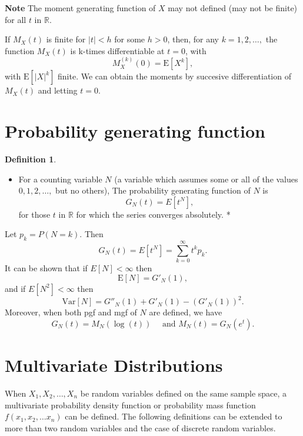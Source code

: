 \documentclass[
]{book}
\providecommand{\tightlist}{%
  \setlength{\itemsep}{0pt}\setlength{\parskip}{0pt}}
\theoremstyle{definition}
\newtheorem{definition}{Definition}[chapter]
\theoremstyle{definition}
\theoremstyle{definition}
\theoremstyle{definition}
\theoremstyle{remark}
\begin{document}
\textbf{Note} The moment generating function of \(X\) may not defined (may not
be finite) for all \(t\) in \(\mathbb{R}\).

If \(M_X(t)\) is finite for \(|t| < h\) for some \(h > 0\), then, for any
\(k = 1, 2, \ldots,\) the function \(M_X(t)\) is k-times differentiable at
\(t = 0\), with \[M^{(k)}_X (0) = \mathrm{E}[X^k],\] with
\(\mathrm{E}[|X|^k]\) finite. We can obtain the moments by succesive
differentiation of \(M_X(t)\) and letting \(t = 0\).

\hypertarget{probability-generating-function}{%
\section{Probability generating function}\label{probability-generating-function}}

\begin{definition}
\protect\hypertarget{def:unlabeled-div-16}{}\label{def:unlabeled-div-16}

\begin{itemize}
\tightlist
\item
  For a counting variable \(N\) (a variable which
  assumes some or all of the values \(0, 1, 2, \ldots,\) but no others), The
  probability generating function of \(N\) is \[G_N(t) = E[t^N],\] for those
  \(t\) in \(\mathbb{R}\) for which the series converges absolutely. *
\end{itemize}

\end{definition}

Let \(p_k = P(N = k)\). Then
\[G_N(t) = E[t^N] = \sum_{k=0}^\infty t^k p_k.\] It can be shown that if
\(E[N] < \infty\) then \[\mathrm{E}[N] = G'_N(1),\] and if
\(E[N^2] < \infty\) then
\[\mathrm{Var}[N] = G''_N(1) + G'_N(1) - (G'_N(1))^2.\] Moreover, when
both pgf and mgf of \(N\) are defined, we have
\[G_N(t) = M_N(\log(t)) \quad \text{ and } M_N(t) = G_N(e^t).\]

\hypertarget{multivariate-distributions}{%
\section{Multivariate Distributions}\label{multivariate-distributions}}

When \(X_1,X_2,\ldots ,X_n\) be random variables defined on the same
sample space, a multivariate probability density function or probability
mass function\\
\(f(x_1, x_2, \ldots x_n)\) can be defined. The following definitions can
be extended to more than two random variables and the case of discrete
random variables.
\end{document}
